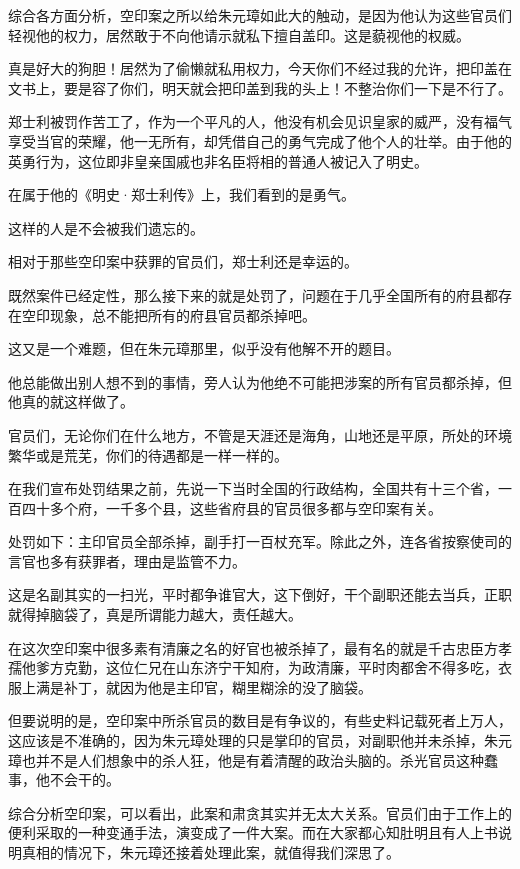 \begin{multicols}{\theparacolNo}
		综合各方面分析，空印案之所以给朱元璋如此大的触动，是因为他认为这些官员们轻视他的权力，居然敢于不向他请示就私下擅自盖印。这是藐视他的权威。

		真是好大的狗胆！居然为了偷懒就私用权力，今天你们不经过我的允许，把印盖在文书上，要是容了你们，明天就会把印盖到我的头上！不整治你们一下是不行了。

		郑士利被罚作苦工了，作为一个平凡的人，他没有机会见识皇家的威严，没有福气享受当官的荣耀，他一无所有，却凭借自己的勇气完成了他个人的壮举。由于他的英勇行为，这位即非皇亲国戚也非名臣将相的普通人被记入了明史。

		在属于他的《明史·郑士利传》上，我们看到的是勇气。

		这样的人是不会被我们遗忘的。

		相对于那些空印案中获罪的官员们，郑士利还是幸运的。

		既然案件已经定性，那么接下来的就是处罚了，问题在于几乎全国所有的府县都存在空印现象，总不能把所有的府县官员都杀掉吧。

		这又是一个难题，但在朱元璋那里，似乎没有他解不开的题目。

		他总能做出别人想不到的事情，旁人认为他绝不可能把涉案的所有官员都杀掉，但他真的就这样做了。

		官员们，无论你们在什么地方，不管是天涯还是海角，山地还是平原，所处的环境繁华或是荒芜，你们的待遇都是一样一样的。

		在我们宣布处罚结果之前，先说一下当时全国的行政结构，全国共有十三个省，一百四十多个府，一千多个县，这些省府县的官员很多都与空印案有关。

		处罚如下：主印官员全部杀掉，副手打一百杖充军。除此之外，连各省按察使司的言官也多有获罪者，理由是监管不力。

		这是名副其实的一扫光，平时都争谁官大，这下倒好，干个副职还能去当兵，正职就得掉脑袋了，真是所谓能力越大，责任越大。

		在这次空印案中很多素有清廉之名的好官也被杀掉了，最有名的就是千古忠臣方孝孺他爹方克勤，这位仁兄在山东济宁干知府，为政清廉，平时肉都舍不得多吃，衣服上满是补丁，就因为他是主印官，糊里糊涂的没了脑袋。

		但要说明的是，空印案中所杀官员的数目是有争议的，有些史料记载死者上万人，这应该是不准确的，因为朱元璋处理的只是掌印的官员，对副职他并未杀掉，朱元璋也并不是人们想象中的杀人狂，他是有着清醒的政治头脑的。杀光官员这种蠢事，他不会干的。

		综合分析空印案，可以看出，此案和肃贪其实并无太大关系。官员们由于工作上的便利采取的一种变通手法，演变成了一件大案。而在大家都心知肚明且有人上书说明真相的情况下，朱元璋还接着处理此案，就值得我们深思了。


\end{multicols}
